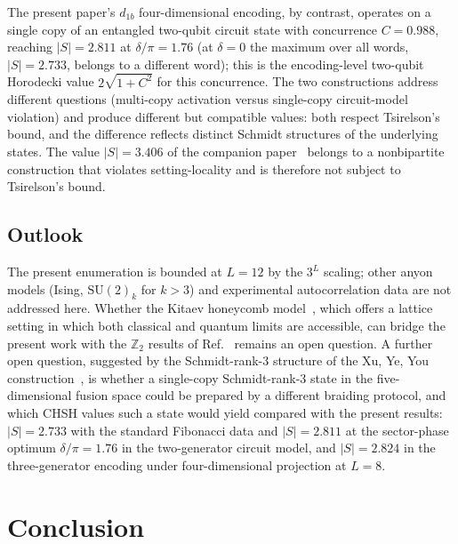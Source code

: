 \documentclass[aps,pra,twocolumn,superscriptaddress,longbibliography,floatfix,nofootinbib]{revtex4-2}
\begin{document}
The present paper's $d_{1b}$ four-dimensional encoding, by contrast,
operates on a single copy of an entangled two-qubit circuit state with
concurrence $C = 0.988$, reaching $|S| = 2.811$ at $\delta/\pi = 1.76$
(at $\delta = 0$ the maximum over all words, $|S| = 2.733$, belongs to a
different word); this is the encoding-level two-qubit Horodecki value
$2\sqrt{1+C^2}$ for this concurrence. The two constructions address
different questions (multi-copy activation versus single-copy
circuit-model violation) and produce different but compatible values:
both respect Tsirelson's bound, and the difference reflects distinct
Schmidt structures of the underlying states. The value $|S| = 3.406$ of
the companion paper~\cite{Sayim2026chsh} belongs to a nonbipartite
construction that violates setting-locality and is therefore not subject
to Tsirelson's bound.

\subsection{Outlook}

The present enumeration is bounded at $L=12$ by the $3^L$ scaling;
other anyon models (Ising, $\text{SU}(2)_k$ for $k>3$) and experimental
autocorrelation data are not addressed here.
Whether the Kitaev honeycomb model~\cite{Kitaev2006}, which offers a
lattice setting in which both classical and quantum limits are accessible,
can bridge the present work with the $\mathbb{Z}_2$ results of
Ref.~\cite{Sayim2026topological} remains an open question.
A further open question, suggested by the Schmidt-rank-3 structure of
the Xu, Ye, You construction~\cite{Xu2025}, is whether a single-copy
Schmidt-rank-3 state in the five-dimensional fusion space could be
prepared by a different braiding protocol, and which CHSH values such a
state would yield compared with the present results: $|S| = 2.733$ with
the standard Fibonacci data and $|S| = 2.811$ at the sector-phase
optimum $\delta/\pi = 1.76$ in the two-generator circuit model, and $|S|
= 2.824$ in the three-generator encoding under four-dimensional
projection at $L = 8$.

\section{Conclusion}
\label{sec:conclusion}
\end{document}
